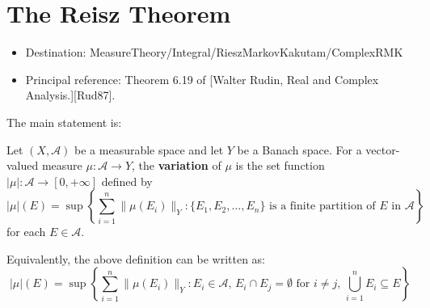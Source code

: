 
\chapter{The Reisz Theorem}

\begin{itemize}
  \item Destination: MeasureTheory/Integral/RieszMarkovKakutam/ComplexRMK
  \item Principal reference: Theorem 6.19 of [Walter Rudin, Real and Complex Analysis.][Rud87].
\end{itemize}

The main statement is:

\noindent
{}

\begin{definition}
  \label{def:variation}
  \leanok
  Let $(X, \mathcal{A})$ be a measurable space and let $Y$ be a Banach space. For a vector-valued measure $\mu: \mathcal{A} \to Y$, the \textbf{variation} of $\mu$ is the set function $|\mu|: \mathcal{A} \to [0, +\infty]$ defined by
  \begin{equation*}
    |\mu|(E) = \sup \left\{ \sum_{i=1}^n \|\mu(E_i)\|_Y : \{E_1, E_2, \ldots, E_n\} \text{ is a finite partition of } E \text{ in } \mathcal{A} \right\}
  \end{equation*}
  for each $E \in \mathcal{A}$.
\end{definition}

Equivalently, the above definition can be written as:
\begin{equation*}
  |\mu|(E) = \sup \left\{ \sum_{i=1}^n \|\mu(E_i)\|_Y : E_i \in \mathcal{A}, \, E_i \cap E_j = \emptyset \text{ for } i \neq j, \, \bigcup_{i=1}^n E_i \subseteq E \right\}
\end{equation*}

